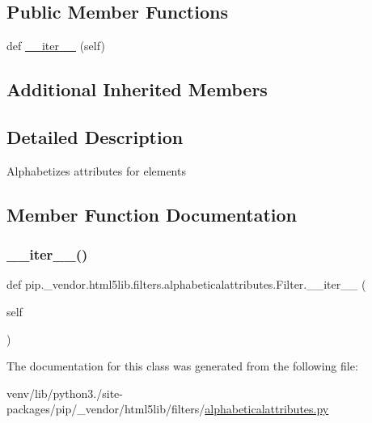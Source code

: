 \subsection*{Public Member Functions}
\begin{DoxyCompactItemize}
\item 
def \hyperlink{classpip_1_1__vendor_1_1html5lib_1_1filters_1_1alphabeticalattributes_1_1Filter_a47faf9a11943ea23c27a99f2f0e4d04a}{\+\_\+\+\_\+iter\+\_\+\+\_\+} (self)
\end{DoxyCompactItemize}
\subsection*{Additional Inherited Members}


\subsection{Detailed Description}
\begin{DoxyVerb}Alphabetizes attributes for elements\end{DoxyVerb}
 

\subsection{Member Function Documentation}
\mbox{\label{classpip_1_1__vendor_1_1html5lib_1_1filters_1_1alphabeticalattributes_1_1Filter_a47faf9a11943ea23c27a99f2f0e4d04a}} 
\subsubsection{\texorpdfstring{\+\_\+\+\_\+iter\+\_\+\+\_\+()}{\_\_iter\_\_()}}
{\footnotesize\ttfamily def pip.\+\_\+vendor.\+html5lib.\+filters.\+alphabeticalattributes.\+Filter.\+\_\+\+\_\+iter\+\_\+\+\_\+ (\begin{DoxyParamCaption}\item[{}]{self }\end{DoxyParamCaption})}



The documentation for this class was generated from the following file\+:\begin{DoxyCompactItemize}
\item 
venv/lib/python3./site-\/packages/pip/\+\_\+vendor/html5lib/filters/\hyperlink{alphabeticalattributes_8py}{alphabeticalattributes.\+py}\end{DoxyCompactItemize}
